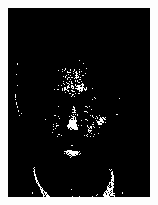 \begin{figure}[h]
\begin{subfigure}[b]{0.18\textwidth}
         \includegraphics[width=\textwidth]{images/results/base_st/dd110.color.d3_dyc.png}
     \end{subfigure}
     \begin{subfigure}[b]{0.18\textwidth}
         \centering

\end{subfigure}
\end{figure}
